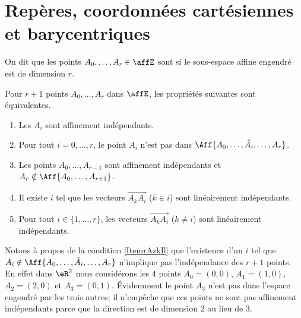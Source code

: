 \section{Repères, coordonnées cartésiennes et barycentriques}

\begin{definition}
    On dit que les points \( A_0,\ldots, A_r\in \affE\) sont  si le sous-espace affine engendré est de dimension \( r\).
\end{definition}

\begin{proposition}  \label{PropGAneHg}
    Pour \( r+1\) points \( A_0,\ldots, A_r\) dans \( \affE\), les propriétés suivantes sont équivalentes.
    \begin{enumerate}
        \item
            Les \( A_i\) sont affinement indépendants.
        \item
            Pour tout \( i=0,\ldots, r\), le point \( A_i\) n'est pas dans \( \Aff\{ A_0,\ldots, \hat A_i,\ldots, A_r \}\).
        \item\label{ItemrAzkIl}
            Les points \( A_0,\ldots, A_{r-1}\) sont affinement indépendants et \( A_r\notin\Aff\{ A_0,\ldots, A_{r+1} \}\).
        \item
            Il existe \( i\) tel que les vecteurs \( \overrightarrow{ A_kA_i }\) (\( k\in i\)) sont linéairement indépendants.
        \item\label{ItemFBfcuq}
            Pour tout \( i\in\{ 1,\ldots, r \}\), les vecteurs \( \overrightarrow{ A_kA_i }\) (\( k\neq i\)) sont linéairement indépendants.
    \end{enumerate}
\end{proposition}

Notons à propos de la condition \ref{ItemrAzkIl} que l'existence d'un \( i\) tel que \( A_i\notin\Aff\{ A_0,\ldots, \hat A_i,\ldots, A_r \}\) n'implique pas l'indépendance des \( r+1\) points. En effet dans \( \eR^2\) nous considérons les \( 4\) points \( A_0=(0,0)\), \( A_1=(1,0)\), \( A_2=(2,0)\) et \( A_3=(0,1)\). Évidemment le point \( A_3\) n'est pas dans l'espace engendré par les trois autres; il n'empêche que ces points ne sont pas affinement indépendants parce que la direction est de dimension \( 2\) au lieu de \( 3\).

